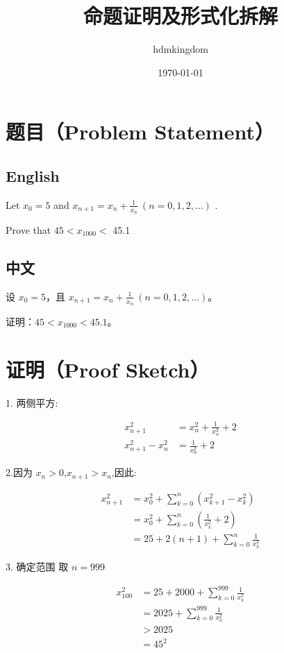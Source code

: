 \documentclass[11pt]{article}
\title{命题证明及形式化拆解}
\author{hdmkingdom}
\date{\today}
\begin{document}
\maketitle

\section*{题目（Problem Statement）}

\subsection*{English}
Let $x_{0}=5$ and $x_{n+1}=x_{n}+\frac{1} {x_{n}} ~ ( n=0, 1, 2, \ldots)$ . 

Prove that $4 5 < x_{1 0 0 0} <$ 45.1

\subsection*{中文}
设 $x_{0}=5$，且 $x_{n+1}=x_{n}+\frac{1}{x_{n}} ~ (n=0, 1, 2, \ldots)$。

证明：$45 < x_{1000} < 45.1$。

\section*{证明（Proof Sketch）}

1. 两侧平方:

\begin{align}
x_{n+1}^2 &= x_n^2 + \frac{1}{x_n^2} + 2\\
x_{n+1}^2 - x_n^2 &= \frac{1}{x_n^2} + 2 \label{eq:formula2}
\end{align}

2.因为 $x_n > 0$,$x_{n+1} > x_n$,因此:

\begin{align}
x_{n+1}^2 & = x_0^2 + \sum_{k=0}^{n}(x_{k+1}^2 - x_k^2)\\
& = x_0^2 + \sum_{k=0}^{n}(\frac{1}{x_k^2} + 2) \\
& = 25 + 2(n+1) + \sum_{k=0}^{n}\frac{1}{x_k^2} \label{eq:formula5} 
\end{align}

3. 确定范围 取 $n = 999$

\begin{align}
x_{100}^2 & = 25 + 2000 + \sum_{k=0}^{999}\frac{1}{x_k^2}\\
& = 2025 + \sum_{k=0}^{999}\frac{1}{x_k^2} \\
& > 2025 \\
& = 45^2
\end{align}
\end{document}
